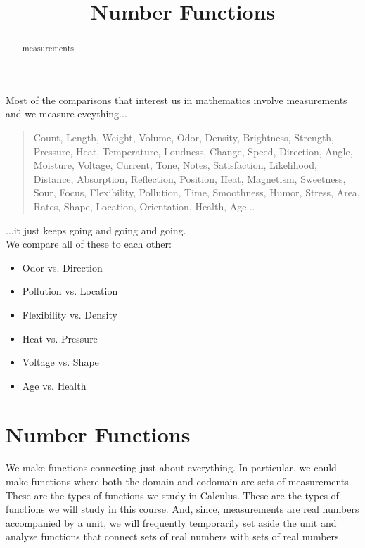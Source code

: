 \documentclass{ximera}
\title{Number Functions}
\begin{document}
\begin{abstract}
measurements
\end{abstract}
\maketitle





Most of the comparisons that interest us in mathematics involve measurements and we measure eveything...\\

\begin{quote}
Count, Length, Weight, Volume, Odor, Density, Brightness, Strength, Pressure, Heat, Temperature, Loudness, Change, Speed, Direction, Angle, Moisture, Voltage, Current, Tone, Notes, Satisfaction, Likelihood, Distance, Absorption, Reflection, Position, Heat, Magnetism, Sweetness, Sour, Focus, Flexibility, Pollution, Time, Smoothness, Humor, Stress, Area, Rates, Shape, Location, Orientation, Health, Age... \\
\end{quote}


...it just keeps going and going and going. \\


We compare all of these to each other:



\begin{itemize}
\item Odor vs. Direction
\item Pollution vs. Location
\item Flexibility vs. Density
\item Heat vs. Pressure
\item Voltage vs. Shape 
\item Age vs. Health
\end{itemize}







\section{Number Functions}

We make functions connecting just about everything.  In particular, we could make functions where both the domain and codomain are sets of measurements. These are the types of functions we study in Calculus.  These are the types of functions we will study in this course.  And, since, measurements are real numbers accompanied by a unit, we will frequently temporarily set aside the unit and analyze functions that connect sets of real numbers with sets of real numbers. \\
\end{document}
